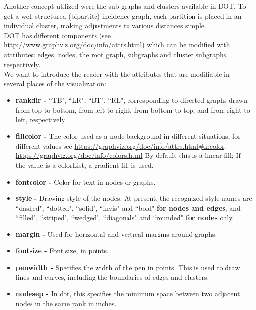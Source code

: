 \documentclass[a4paper, 12pt, bibliography=totoc]{scrartcl}
\begin{document}
Another concept utilized were the sub-graphs and clusters available in DOT.
To get a well structured (bipartite) incidence graph, each partition is placed in an individual cluster, making adjustments to various distances simple.\\


DOT has different components (see \url{http://www.graphviz.org/doc/info/attrs.html}) which can be modified with attributes: edges, nodes, the root graph, subgraphs and cluster subgraphs, respectively.\\


We want to introduce the reader with the attributes that are modifiable in several places of the visualization:

\begin{itemize}
	\item \textbf{rankdir -} ``TB", ``LR", ``BT", ``RL", corresponding to directed graphs drawn from top to bottom, from left to right, from bottom to top, and from right to left, respectively.
	
	\item \textbf{fillcolor -} The color used as a node-background in different situations, for different values see \url{https://graphviz.org/doc/info/attrs.html#k:color}. \url{https://graphviz.org/doc/info/colors.html} 
	By default this is a linear fill; If the value is a colorList, a gradient fill is used. 
	
	\item \textbf{fontcolor -} Color for text in nodes or graphs. 
	
	\item \textbf{style -} Drawing style of the nodes.
	At present, the recognized style names are ``dashed", ``dotted", ``solid", ``invis" and ``bold" \textbf{for nodes and edges},  and ``filled", ``striped", ``wedged", ``diagonals" and ``rounded" \textbf{for nodes} only.
	
	\item 
	\textbf{margin -} Used for horizontal and vertical margins around graphs.
	
	\item \textbf{fontsize -} Font size, in points. 
	
	\item \textbf{penwidth -} Specifies the width of the pen in points. This is used to draw lines and curves, including the boundaries of edges and clusters. 
	
	\item \textbf{nodesep -} In dot, this specifies the minimum space between two adjacent nodes in the same rank in inches. 
	

\end{itemize}
\end{document}
